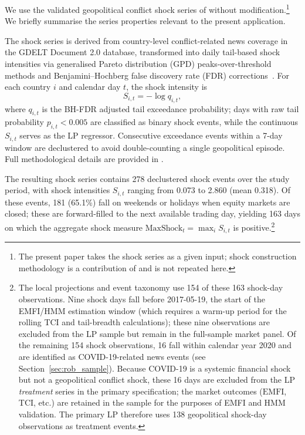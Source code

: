 \documentclass[11pt]{article}
\begin{document}
We use the validated geopolitical conflict shock series of \citet{lupu2026bir}
without modification.\footnote{The present paper takes the shock series as a
given input; shock construction methodology is a contribution of \citet{lupu2026bir}
and is not repeated here.} We briefly summarise the series properties relevant
to the present application.

The shock series is derived from country-level conflict-related news
coverage in the GDELT Document 2.0 database, transformed into daily
tail-based shock intensities via generalised Pareto distribution (GPD)
peaks-over-threshold methods and Benjamini--Hochberg false discovery rate
(FDR) corrections~\citep{benjaminihochberg1995}.
For each country $i$ and calendar day $t$, the shock intensity is
\begin{equation}
  S_{i,t} = -\log q_{i,t},
  \label{eq:shock}
\end{equation}
where $q_{i,t}$ is the BH-FDR adjusted tail exceedance probability;
days with raw tail probability $p_{i,t} < 0.005$ are classified as
binary shock events, while the continuous $S_{i,t}$ serves as the
LP regressor.
Consecutive exceedance events within a 7-day window are declustered
to avoid double-counting a single geopolitical episode.
Full methodological details are provided in \citet{lupu2026bir}.

The resulting shock series contains 278 declustered shock events over the
study period, with shock intensities $S_{i,t}$ ranging from 0.073 to 2.860
(mean 0.318).
Of these events, 181 (65.1\%) fall on weekends or holidays when equity
markets are closed; these are forward-filled to the next available trading
day, yielding 163 days on which the aggregate shock measure
$\text{MaxShock}_t = \max_i S_{i,t}$ is positive.\footnote{
  The local projections and event taxonomy use 154 of these
  163 shock-day observations. Nine shock days fall before
  2017-05-19, the start of the EMFI/HMM estimation window
  (which requires a warm-up period for the rolling TCI and
  tail-breadth calculations); these nine observations are
  excluded from the LP sample but remain in the full-sample
  market panel. Of the remaining 154 shock observations, 16
  fall within calendar year 2020 and are identified as
  COVID-19-related news events (see Section~\ref{sec:rob_sample}).
  Because COVID-19 is a systemic financial shock but not
  a geopolitical conflict shock, these 16 days are excluded
  from the LP \emph{treatment} series in the primary specification;
  the market outcomes ($\text{EMFI}$, TCI, etc.) are retained in
  the sample for the purposes of EMFI and HMM validation.
  The primary LP therefore uses 138 geopolitical shock-day
  observations as treatment events.}
\end{document}
